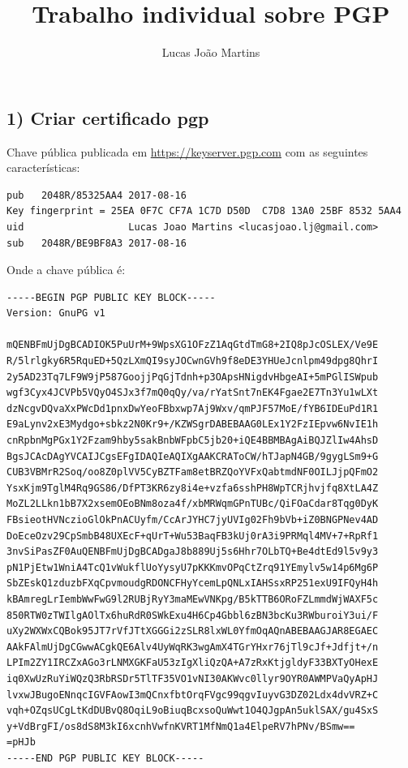 \documentclass[12pt]{article}
\title{Trabalho individual sobre PGP}
\author{Lucas João Martins}
\date{}
\begin{document}
\maketitle

\section*{}
\subsection*{1) Criar certificado pgp}
Chave pública publicada em \url{https://keyserver.pgp.com} com as seguintes características:

\begin{lstlisting}
pub   2048R/85325AA4 2017-08-16
Key fingerprint = 25EA 0F7C CF7A 1C7D D50D  C7D8 13A0 25BF 8532 5AA4
uid                  Lucas Joao Martins <lucasjoao.lj@gmail.com>
sub   2048R/BE9BF8A3 2017-08-16
\end{lstlisting}

Onde a chave pública é:

\begin{lstlisting}
-----BEGIN PGP PUBLIC KEY BLOCK-----
Version: GnuPG v1

mQENBFmUjDgBCADIOK5PuUrM+9WpsXG1OFzZ1AqGtdTmG8+2IQ8pJcOSLEX/Ve9E
R/5lrlgky6R5RquED+5QzLXmQI9syJOCwnGVh9f8eDE3YHUeJcnlpm49dpg8QhrI
2y5AD23Tq7LF9W9jP587GoojjPqGjTdnh+p3OApsHNigdvHbgeAI+5mPGlISWpub
wgf3Cyx4JCVPb5VQyO4SJx3f7mQ0qQy/va/rYatSnt7nEK4Fgae2E7Tn3Yu1wLXt
dzNcgvDQvaXxPWcDd1pnxDwYeoFBbxwp7Aj9Wxv/qmPJF57MoE/fYB6IDEuPd1R1
E9aLynv2xE3Mydgo+sbkz2N0Kr9+/KZWSgrDABEBAAG0LEx1Y2FzIEpvw6NvIE1h
cnRpbnMgPGx1Y2Fzam9hby5sakBnbWFpbC5jb20+iQE4BBMBAgAiBQJZlIw4AhsD
BgsJCAcDAgYVCAIJCgsEFgIDAQIeAQIXgAAKCRAToCW/hTJapN4GB/9gygLSm9+G
CUB3VBMrR2Soq/oo8Z0plVV5CyBZTFam8etBRZQoYVFxQabtmdNF0OILJjpQFmO2
YsxKjm9TglM4Rq9GS86/DfPT3KR6zy8i4e+vzfa6sshPH8WpTCRjhvjfq8XtLA4Z
MoZL2LLkn1bB7X2xsemOEoBNm8oza4f/xbMRWqmGPnTUBc/QiFOaCdar8Tqg0DyK
FBsieotHVNczioGlOkPnACUyfm/CcArJYHC7jyUVIg02Fh9bVb+iZ0BNGPNev4AD
DoEceOzv29CpSmbB48UXEcF+qUrT+Wu53BaqFB3kUj0rA3i9PRMql4MV+7+RpRf1
3nvSiPasZF0AuQENBFmUjDgBCADgaJ8b889Uj5s6Hhr7OLbTQ+Be4dtEd9l5v9y3
pN1PjEtw1WniA4TcQ1vWukflUoYysyU7pKKKmvOPqCtZrq91YEmylv5w14p6Mg6P
SbZEskQ1zduzbFXqCpvmoudgRDONCFHyYcemLpQNLxIAHSsxRP251exU9IFQyH4h
kBAmregLrIembWwFwG9l2RUBjRyY3maMEwVNKpg/B5kTTB6ORoFZLmmdWjWAXF5c
850RTW0zTWIlgAOlTx6huRdR0SWkExu4H6Cp4Gbbl6zBN3bcKu3RWburoiY3ui/F
uXy2WXWxCQBok95JT7rVfJTtXGGGi2zSLR8lxWL0YfmOqAQnABEBAAGJAR8EGAEC
AAkFAlmUjDgCGwwACgkQE6Alv4UyWqRK3wgAmX4TGrYHxr76jTl9cJf+Jdfjt+/n
LPIm2ZY1IRCZxAGo3rLNMXGKFaU53zIgXliQzQA+A7zRxKtjgldyF33BXTyOHexE
iq0XwUzRuYiWQzQ3RbRSDr5TlTF35VO1vNI30AKWvc0llyr9OYR0AWMPVaQyApHJ
lvxwJBugoENnqcIGVFAowI3mQCnxfbtOrqFVgc99qgvIuyvG3DZ02Ldx4dvVRZ+C
vqh+OZqsUCgLtKdDUBvQ8OqiL9oBiuqBcxsoQuWwt1O4QJgpAn5uklSAX/gu4SxS
y+VdBrgFI/os8dS8M3kI6xcnhVwfnKVRT1MfNmQ1a4ElpeRV7hPNv/BSmw==
=pHJb
-----END PGP PUBLIC KEY BLOCK-----
\end{lstlisting}
\end{document}
